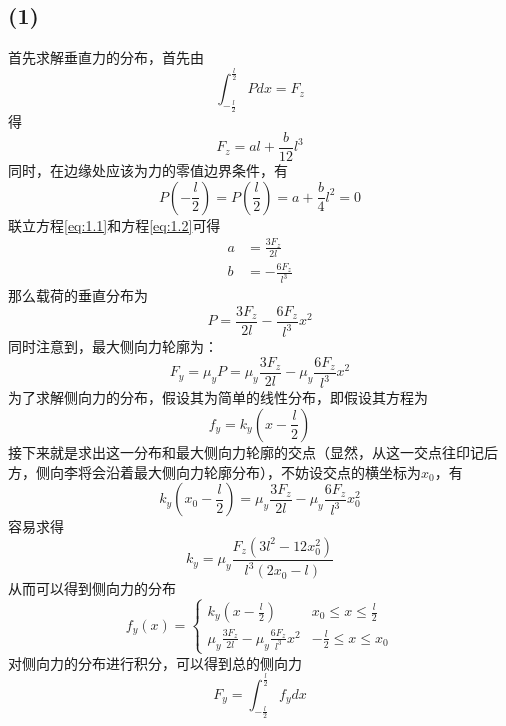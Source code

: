 \documentclass[paper=a4, fontsize=11pt]{scrartcl} %
\numberwithin{equation}{section} %
\numberwithin{figure}{section} %
\numberwithin{table}{section} %
\begin{document}
\subsection{(1)}
首先求解垂直力的分布，首先由
\begin{equation}
\int_{-\frac{l}{2}}^{\frac{l}{2}} P dx = F_z
\end{equation}
得
\begin{equation}
\label{eq:1.1}
F_z = al + \frac{b}
{12}l^3
\end{equation}
同时，在边缘处应该为力的零值边界条件，有
\begin{equation}
\label{eq:1.2}
P(-\frac{l}{2}) = 
P(\frac{l}{2}) = a + \frac{b}{4}l^2 = 0
\end{equation}
联立方程\ref{eq:1.1}和方程\ref{eq:1.2}可得
\begin{align*}
a & = \frac{3F_z}{2l}\\
b & = -\frac{6F_z}{l^3}
\end{align*}
那么载荷的垂直分布为
\begin{equation*}
P = \frac{3F_z}{2l} -\frac{6F_z}{l^3}x^2
\end{equation*}
同时注意到，最大侧向力轮廓为：
\begin{equation*}
F_y = \mu_y P = \mu_y\frac{3F_z}{2l} -\mu_y\frac{6F_z}{l^3}x^2
\end{equation*}
为了求解侧向力的分布，假设其为简单的线性分布，即假设其方程为
\begin{equation}
f_y = k_y (x-\frac{l}{2})
\end{equation}
接下来就是求出这一分布和最大侧向力轮廓的交点（显然，从这一交点往印记后方，侧向李将会沿着最大侧向力轮廓分布），不妨设交点的横坐标为$x_0$，有
\begin{equation}
k_y (x_0-\frac{l}{2}) = \mu_y\frac{3F_z}{2l} -\mu_y\frac{6F_z}{l^3}x_0^2
\end{equation}
容易求得
\begin{equation}
k_y = \mu_y \frac{F_z(3l^2-12x_0^2)}{l^3(2x_0-l)}
\end{equation}
从而可以得到侧向力的分布
\begin{equation}
\label{eq:cepian}
f_y(x)=
\begin{cases}
k_y(x-\frac{l}{2})& \text{$x_0 \leq x \leq \frac{l}{2}$}\\
\mu_y\frac{3F_z}{2l} -\mu_y\frac{6F_z}{l^3}x^2& \text{$-\frac{l}{2} \leq x \leq x_0$}
\end{cases}
\end{equation}
对侧向力的分布进行积分，可以得到总的侧向力
\begin{equation}
F_y = \int_{-\frac{l}{2}}^{\frac{l}{2}} f_y dx
\end{equation}
\end{document}
